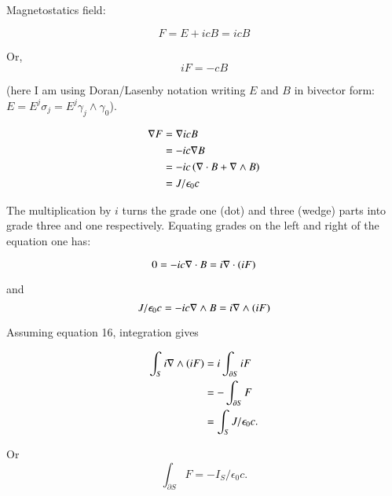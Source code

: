 \documentclass{article}      %
\begin{document}

%

Magnetostatics field:

\begin{equation*}
F = E + icB = icB
\end{equation*}

Or,
\begin{equation*}
iF = -cB
\end{equation*}

(here I am using Doran/Lasenby notation writing $E$ and $B$ in bivector form: $E = E^j \sigma_j = E^j \gamma_j \wedge \gamma_0$).

\begin{align*}
\nabla F 
&= \nabla icB \\
&= -i c \nabla B \\
&= -i c \left( \nabla \cdot B + \nabla \wedge B \right) \\
&= J/\epsilon_0 c
\end{align*}

The multiplication by $i$ turns the grade one (dot) and three (wedge) parts into grade three and one respectively.  Equating grades on the left and right of the equation one has:

\begin{equation*}
0 = -i c \nabla \cdot B = i \nabla \cdot ( iF )
\end{equation*}

and
\begin{equation*}
J/\epsilon_0 c = -i c \nabla \wedge B = i \nabla \wedge (iF)
\end{equation*}

Assuming equation 16, integration gives

\begin{align*}
\int_S i \nabla \wedge (iF) 
&= i \int_{\partial S} iF \\
&= -\int_{\partial S} F \\
&= \int_S J/\epsilon_0 c.
\end{align*}

Or
\begin{equation*}
\int_{\partial S} F = -I_S/\epsilon_0 c.
\end{equation*}
\end{document}

